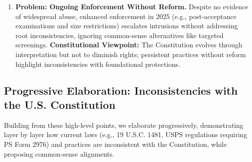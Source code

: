 \begin{enumerate}
\item \textbf{Problem: Ongoing Enforcement Without Reform.}
Despite no evidence of widespread abuse, enhanced enforcement in 2025 (e.g., post-acceptance examinations and size restrictions) escalates intrusions without addressing root inconsistencies, ignoring common-sense alternatives like targeted screenings.
\textbf{Constitutional Viewpoint:} The Constitution evolves through interpretation but not to diminish rights; persistent practices without reform highlight inconsistencies with foundational protections.
\end{enumerate}

\subsection{Progressive Elaboration: Inconsistencies with the U.S. Constitution}
Building from these high-level points, we elaborate progressively, demonstrating layer by layer how current laws (e.g., 19 U.S.C.  1481, USPS regulations requiring PS Form 2976) and practices are inconsistent with the Constitution, while proposing common-sense alignments.
